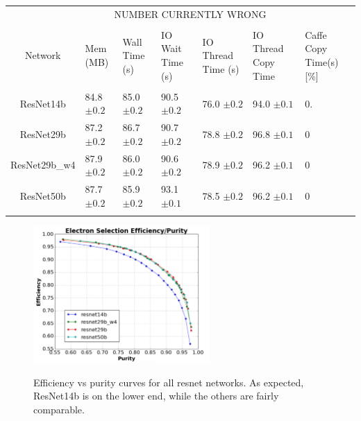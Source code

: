 \documentclass[11pt,a4paper]{article}
\begin{document}
\par \noindent
\vspace{2 mm}
\begin{minipage}{\linewidth}
\centering
{} \label{tab:resnetComput} 
\begin{tabular}{cllllll}
 & \multicolumn{5}{c}{NUMBER CURRENTLY WRONG} \\
\cline{2-6}
\vspace{-0.1in}\\
\vspace{0.05in}
Network & Mem (MB) & Wall Time (s) & IO Wait Time (s) & IO Thread Time (s) & IO Thread Copy Time & Caffe Copy Time(s) [\%] \\
\hline 
\vspace{-0.1in}\\
\vspace{0.05in}
 ResNet14b & 84.8 $\pm 0.2$ & 85.0 $\pm 0.2$  & 90.5 $\pm 0.2$ & 76.0 $\pm 0.2$ & 94.0 $\pm 0.1$ & 0. \\ 
 \vspace{0.05in}
 ResNet29b & 87.2 $\pm 0.2$ & 86.7 $\pm 0.2$  & 90.7 $\pm 0.2$ & 78.8 $\pm 0.2$ & 96.8 $\pm 0.1$ & 0 \\ 
 \vspace{0.05in}
 ResNet29b\_w4 & 87.9 $\pm 0.2 $ & 86.0 $\pm 0.2$  & 90.6 $\pm 0.2$ & 78.9 $\pm 0.2$ & 96.2 $\pm 0.1$ & 0 \\ 
 \vspace{0.05in}
 ResNet50b & 87.7 $\pm 0.2$ & 85.9 $\pm 0.2$  & 93.1 $\pm 0.1$ & 78.5 $\pm 0.2$ & 96.2 $\pm 0.1$ & 0\\ 
 \vspace{0.05in}
    \end{tabular}
\end{minipage}

\begin{figure}[t]
  \centering  
\includegraphics[width=0.6\textwidth]{Figures/resneteffpur.png}\\
\caption{Efficiency vs purity curves for all resnet networks.  As expected, ResNet14b is on the lower end, while the others are fairly comparable. }
  \label{fig:resneteffpur}
\end{figure}
\end{document}
